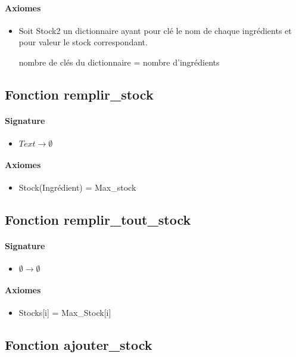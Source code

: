 \documentclass[]{article}
\begin{document}
\paragraph{Axiomes}
\begin{itemize}
\item
  Soit Stock2 un dictionnaire ayant pour clé le nom de chaque
  ingrédients et pour valeur le stock correspondant.

nombre de clés du dictionnaire = nombre d'ingrédients
\end{itemize}

\subsection*{Fonction remplir\_stock}
\paragraph{Signature}
\begin{itemize}
\item
  $  Text \longrightarrow \emptyset$
\end{itemize}
\paragraph{Axiomes}
\begin{itemize}
\item
Stock(Ingrédient) = Max\_stock
\end{itemize}

\subsection*{Fonction remplir\_tout\_stock}
\paragraph{Signature}
\begin{itemize}
\item
  $  \emptyset \longrightarrow \emptyset$
\end{itemize}
\paragraph{Axiomes}
\begin{itemize}
\item
Stocks{[}i{]} = Max\_Stock{[}i{]}
\end{itemize}

\subsection*{Fonction ajouter\_stock}
\end{document}
